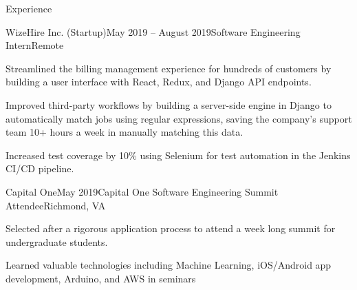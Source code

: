 \documentclass{resume}
\begin{document}
\begin{rSection}{Experience}
  \begin{rSubsection}{WizeHire Inc. (Startup)}{May 2019 -- August 2019}{Software Engineering Intern}{Remote}
    \item Streamlined the billing management experience for hundreds of customers by building a user interface with React, Redux, and Django API endpoints.
    \item Improved third-party workflows by building a server-side engine in Django to automatically match jobs using regular expressions, saving the company's support team 10+ hours a week in manually matching this data.
    \item Increased test coverage by 10\% using Selenium for test automation in the Jenkins CI/CD pipeline.
  \end{rSubsection}

  \begin{rSubsection}{Capital One}{May 2019}{Capital One Software Engineering Summit Attendee}{Richmond, VA}
    \item Selected after a rigorous application process to attend a week long summit for undergraduate students.
    \item Learned valuable technologies including Machine Learning, iOS/Android app development, Arduino, and AWS in seminars
  \end{rSubsection}


\end{rSection}
\end{document}
